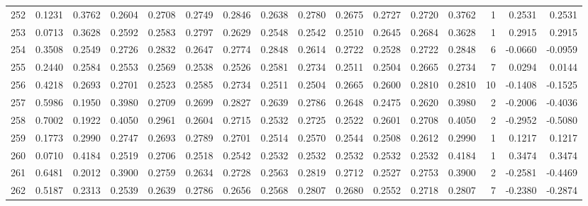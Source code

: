 \begin{tabular}{lrrrrrrrrrrrrrrr}
252 &      0.1231 &  0.3762 &  0.2604 &  0.2708 &  0.2749 &  0.2846 &  0.2638 &  0.2780 &  0.2675 &  0.2727 &   0.2720 &     0.3762 &      1 &                    0.2531 &                     0.2531 \\
253 &      0.0713 &  0.3628 &  0.2592 &  0.2583 &  0.2797 &  0.2629 &  0.2548 &  0.2542 &  0.2510 &  0.2645 &   0.2684 &     0.3628 &      1 &                    0.2915 &                     0.2915 \\
254 &      0.3508 &  0.2549 &  0.2726 &  0.2832 &  0.2647 &  0.2774 &  0.2848 &  0.2614 &  0.2722 &  0.2528 &   0.2722 &     0.2848 &      6 &                   -0.0660 &                    -0.0959 \\
255 &      0.2440 &  0.2584 &  0.2553 &  0.2569 &  0.2538 &  0.2526 &  0.2581 &  0.2734 &  0.2511 &  0.2504 &   0.2665 &     0.2734 &      7 &                    0.0294 &                     0.0144 \\
256 &      0.4218 &  0.2693 &  0.2701 &  0.2523 &  0.2585 &  0.2734 &  0.2511 &  0.2504 &  0.2665 &  0.2600 &   0.2810 &     0.2810 &     10 &                   -0.1408 &                    -0.1525 \\
257 &      0.5986 &  0.1950 &  0.3980 &  0.2709 &  0.2699 &  0.2827 &  0.2639 &  0.2786 &  0.2648 &  0.2475 &   0.2620 &     0.3980 &      2 &                   -0.2006 &                    -0.4036 \\
258 &      0.7002 &  0.1922 &  0.4050 &  0.2961 &  0.2604 &  0.2715 &  0.2532 &  0.2725 &  0.2522 &  0.2601 &   0.2708 &     0.4050 &      2 &                   -0.2952 &                    -0.5080 \\
259 &      0.1773 &  0.2990 &  0.2747 &  0.2693 &  0.2789 &  0.2701 &  0.2514 &  0.2570 &  0.2544 &  0.2508 &   0.2612 &     0.2990 &      1 &                    0.1217 &                     0.1217 \\
260 &      0.0710 &  0.4184 &  0.2519 &  0.2706 &  0.2518 &  0.2542 &  0.2532 &  0.2532 &  0.2532 &  0.2532 &   0.2532 &     0.4184 &      1 &                    0.3474 &                     0.3474 \\
261 &      0.6481 &  0.2012 &  0.3900 &  0.2759 &  0.2634 &  0.2728 &  0.2563 &  0.2819 &  0.2712 &  0.2527 &   0.2753 &     0.3900 &      2 &                   -0.2581 &                    -0.4469 \\
262 &      0.5187 &  0.2313 &  0.2539 &  0.2639 &  0.2786 &  0.2656 &  0.2568 &  0.2807 &  0.2680 &  0.2552 &   0.2718 &     0.2807 &      7 &                   -0.2380 &                    -0.2874 \\

\end{tabular}
